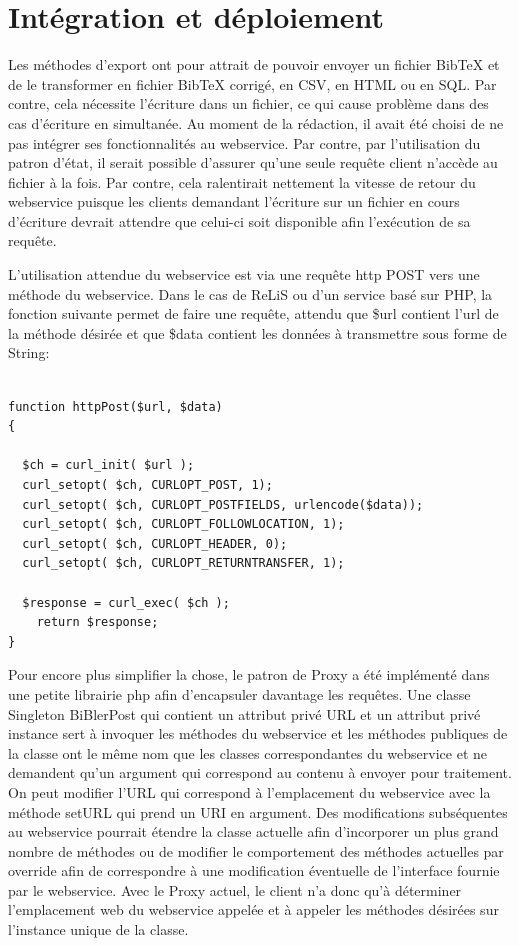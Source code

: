 \documentclass[12pt,titlepage]{article}
\let\oldsection\section
\renewcommand\section{\clearpage\oldsection}
\begin{document}
\section{Intégration et déploiement}


Les méthodes d'export ont pour attrait de pouvoir envoyer un fichier BibTeX et de le transformer en fichier BibTeX corrigé, en CSV, en HTML ou en SQL. Par contre, cela nécessite l'écriture dans un fichier, ce qui cause problème dans des cas d'écriture en simultanée. Au moment de la rédaction, il avait été choisi de ne pas intégrer ses fonctionnalités au webservice. Par contre, par l'utilisation du patron d'état, il serait possible d'assurer qu'une seule requête client n'accède au fichier à la fois. Par contre, cela ralentirait nettement la vitesse de retour du webservice puisque les clients demandant l'écriture sur un fichier en cours d'écriture devrait attendre que celui-ci soit disponible afin l'exécution de sa requête.\newline

L'utilisation attendue du webservice est via une requête http POST vers une méthode du webservice. Dans le cas de ReLiS ou d'un service basé sur PHP, la fonction suivante permet de faire une requête, attendu que \$url contient l'url de la méthode désirée et que \$data contient les données à transmettre sous forme de String: 
\begin{lstlisting}

function httpPost($url, $data)
{

  $ch = curl_init( $url );
  curl_setopt( $ch, CURLOPT_POST, 1);
  curl_setopt( $ch, CURLOPT_POSTFIELDS, urlencode($data));
  curl_setopt( $ch, CURLOPT_FOLLOWLOCATION, 1);
  curl_setopt( $ch, CURLOPT_HEADER, 0);
  curl_setopt( $ch, CURLOPT_RETURNTRANSFER, 1);

  $response = curl_exec( $ch );
    return $response;
}

\end{lstlisting}

Pour encore plus simplifier la chose, le patron de Proxy a été implémenté dans une petite librairie php afin d'encapsuler davantage les requêtes. Une classe Singleton BiBlerPost qui contient un attribut privé URL et un attribut privé instance sert à invoquer les méthodes du webservice et les méthodes publiques de la classe ont le même nom que les classes correspondantes du webservice et ne demandent qu'un argument qui correspond au contenu à envoyer pour traitement. On peut modifier l'URL qui correspond à l'emplacement du webservice avec la méthode setURL qui prend un URI en argument. Des modifications subséquentes au webservice pourrait étendre la classe actuelle afin d'incorporer un plus grand nombre de méthodes ou de modifier le comportement des méthodes actuelles par override afin de correspondre à une modification éventuelle de l'interface fournie par le webservice. Avec le Proxy actuel, le client n'a donc qu'à déterminer l'emplacement web du webservice appelée et à appeler les méthodes désirées sur l'instance unique de la classe.
\end{document}
